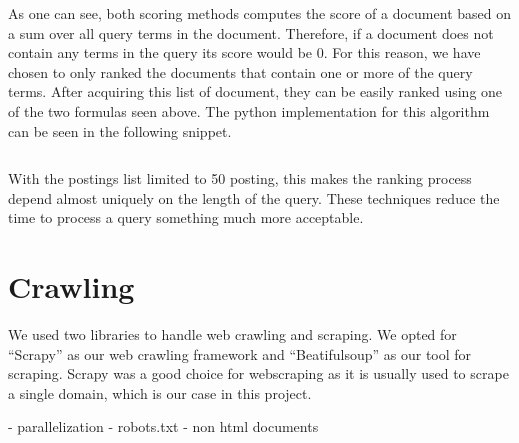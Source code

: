 \documentclass[]{article}
\begin{document}
As one can see, both scoring methods computes the score of a document based on a sum over all query terms in the document. Therefore, if a document does not contain any terms in the query its score would be 0. For this reason, we have chosen to only ranked the documents that contain one or more of the query terms. After acquiring this list of document, they can be easily ranked using one of the two formulas seen above. The python implementation for this algorithm can be seen in the following snippet.

\inputminted[]{python}{snip/documentsrank.py}

With the postings list limited to 50 posting, this makes the ranking process depend almost uniquely on the length of the query. These techniques reduce the time to process a query something much more acceptable.
\section{Crawling}
We used two libraries to handle web crawling and scraping. We opted for ``Scrapy'' as our web crawling framework and ``Beatifulsoup'' as our tool for scraping. Scrapy was a good choice for webscraping as it is usually used to scrape a single domain, which is our case in this project. 

- parallelization
- robots.txt
- non html documents
\end{document}
